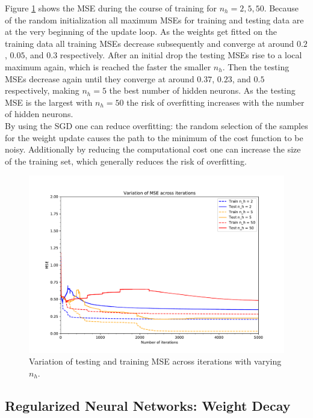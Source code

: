 \documentclass{article}
\begin{document}
Figure \ref{1_1_d_mse} shows the MSE during the course of training for $n_h=2,5,50$. Because of the random initialization all maximum MSEs for training and testing data are at the very beginning of the update loop. As the weights get fitted on the training data all training MSEs decrease subsequently and converge at around $0.2$, $0.05$, and $0.3$ respectively. After an initial drop the testing MSEs rise to a local maximum again, which is reached the faster the smaller $n_h$. Then the testing MSEs decrease again until they converge at around $0.37$, $0.23$, and $0.5$ respectively, making $n_h=5$ the best number of hidden neurons. As the testing MSE is the largest with $n_h=50$ the risk of overfitting increases with the number of hidden neurons.\\
By using the SGD one can reduce overfitting: the random selection of the samples for the weight update causes the path to the minimum of the cost function to be noisy. Additionally by reducing the computational cost one can increase the size of the training set, which generally reduces the risk of overfitting.

\begin{figure}[!ht]
\centering
\includegraphics[width=\textwidth]{./Figures/1_1_d_mse.pdf}
\caption{Variation of testing and training MSE across iterations with varying $n_h$.}
\label{1_1_d_mse}
\end{figure}

\clearpage
\subsection{Regularized Neural Networks: Weight Decay}
\end{document}

